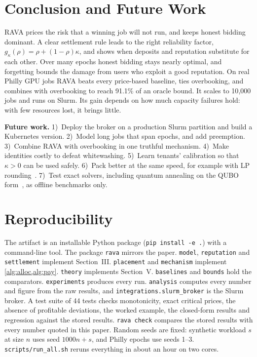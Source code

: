 \documentclass[journal]{IEEEtran}
\theoremstyle{remark}
\begin{document}
\section{Conclusion and Future Work}\label{sec:concl}
RAVA prices the risk that a winning job will not run, and keeps honest bidding dominant. A clear settlement rule leads to the right reliability factor, $g_\kappa(\rho)=\rho+(1-\rho)\kappa$, and shows when deposits and reputation substitute for each other. Over many epochs honest bidding stays nearly optimal, and forgetting bounds the damage from users who exploit a good reputation. On real Philly GPU jobs RAVA beats every price-based baseline, ties overbooking, and combines with overbooking to reach 91.1\% of an oracle bound. It scales to 10{,}000 jobs and runs on Slurm. Its gain depends on how much capacity failures hold: with few resources lost, it brings little.

\textbf{Future work.} 1)~Deploy the broker on a production Slurm partition and build a Kubernetes version. 2)~Model long jobs that span epochs, and add preemption. 3)~Combine RAVA with overbooking in one truthful mechanism. 4)~Make identities costly to defeat whitewashing. 5)~Learn tenants' calibration so that $\kappa>0$ can be used safely. 6)~Pack better at the same speed, for example with LP rounding~\cite{lavi2011}. 7)~Test exact solvers, including quantum annealing on the QUBO form~\cite{lucas2014,farhi2014}, as offline benchmarks only.




\appendices
\section{Reproducibility}
The artifact is an installable Python package (\texttt{pip install -e .}) with a command-line tool. The package \texttt{rava} mirrors the paper. \texttt{model}, \texttt{reputation} and \texttt{settlement} implement Section~III. \texttt{placement} and \texttt{mechanism} implement \cref{alg:alloc,alg:pay}. \texttt{theory} implements Section~V. \texttt{baselines} and \texttt{bounds} hold the comparators. \texttt{experiments} produces every run. \texttt{analysis} computes every number and figure from the raw results, and \texttt{integrations.slurm\_broker} is the Slurm broker. A test suite of 44 tests checks monotonicity, exact critical prices, the absence of profitable deviations, the worked example, the closed-form results and regression against the stored results. \texttt{rava check} compares the stored results with every number quoted in this paper. Random seeds are fixed: synthetic workload $s$ at size $n$ uses seed $1000n+s$, and Philly epochs use seeds 1--3. \texttt{scripts/run\_all.sh} reruns everything in about an hour on two cores.
\end{document}
